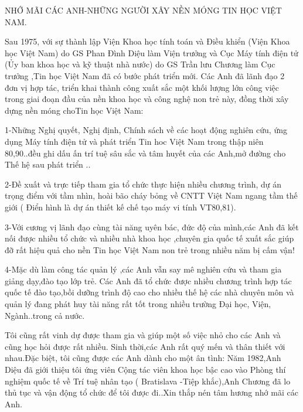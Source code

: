 NHỚ MÃI CÁC ANH-NHỮNG NGƯỜI XÂY NỀN MÓNG TIN HỌC VIỆT NAM.

Sau 1975, với sự thành lập Viện Khoa học tính toán và Điều khiển (Viện Khoa học Việt Nam) do GS Phan Đình Diệu làm Viện trưởng và Cục Máy tính điện tử (Ủy ban khoa học và kỹ thuật nhà nước) do GS Trần lưu Chương làm Cục trưởng ,Tin học Việt Nam đã có bước phát triển mới. Các Anh đã  lãnh đạo 2 đơn vị hợp tác, triển khai thành công xuất sắc một khối lượng lớn công việc trong giai đoạn đầu của nền khoa học và công nghệ non trẻ này, đồng thời xây dựng nền móng choTin học Việt Nam:

1-Những Nghị quyết, Nghị định, Chính sách về các hoạt động nghiên cứu, ứng dụng Máy tính điện tử và phát triển Tin hoc Việt Nam trong thập niên 80,90..đều ghi dấu ấn trí tuệ sâu sắc và tâm huyết của các Anh,mở đường cho Thế hệ sau phát triển ..

2-Đề xuất và trực tiếp tham gia tổ chức thực hiện nhiều chương trình, dự án trọng điểm với tầm nhìn, hoài bão cháy bỏng về CNTT Việt Nam ngang tầm thế giới ( Điển hình là dự án thiết kế chế tạo máy vi tính VT80,81).

3-Với cương vị lãnh đạo cùng tài năng uyên bác, đức độ của mình,các Anh đã kết nối được nhiều tổ chức và nhiều nhà khoa học ,chuyên gia quốc tế  xuất sắc giúp đỡ rất  hiệu quả  cho nền Tin học Việt Nam  non trẻ trong nhiều năm bị cấm vận!

4-Mặc dù làm công tác quản lý ,các Anh vẫn say mê nghiên cứu và tham gia giảng dạy,đào tạo lớp trẻ. Các Anh đã tổ chức được nhiều chương trình hợp tác quốc tế  đào tạo,bồi dưỡng trình độ cao  cho nhiều  thế hệ các nhà chuyên môn và quản lý đang  phát huy tài năng rất tốt trong nhiều trường Đại học, Viện, Ngành..trong cả nước. 

Tôi cũng rất vinh dự được tham gia và giúp một số việc nhỏ cho các Anh và cũng học hỏi được rất nhiều. Sinh thời,các Anh rất quý mến và thân thiết với nhau.Đặc biệt, tôi cũng được các Anh dành cho một ân tình:
Năm 1982,Anh Diệu đã giới thiệu tôi ứng viên Cộng tác viên khoa học bậc cao vào Phòng thí nghiệm quốc tế về Trí tuệ nhân tạo ( Bratislava -Tiệp khắc),Anh Chương đã lo thủ tục và vận động tổ chức để tôi được đi..Xin thắp nén tâm hương nhớ mãi các Anh.